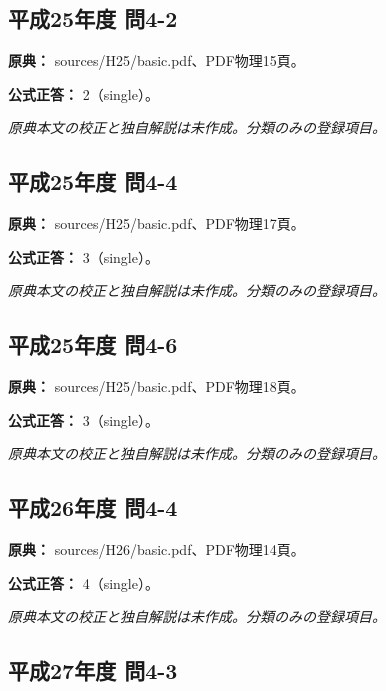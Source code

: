 \subsection{平成25年度 問4-2}
\label{q:h25-reg-basic-4-2}

\noindent\textbf{原典：} sources/H25/basic.pdf、PDF物理15頁。

\textbf{公式正答：} 2（single）。

\par\textit{原典本文の校正と独自解説は未作成。分類のみの登録項目。}

\subsection{平成25年度 問4-4}
\label{q:h25-reg-basic-4-4}

\noindent\textbf{原典：} sources/H25/basic.pdf、PDF物理17頁。

\textbf{公式正答：} 3（single）。

\par\textit{原典本文の校正と独自解説は未作成。分類のみの登録項目。}

\subsection{平成25年度 問4-6}
\label{q:h25-reg-basic-4-6}

\noindent\textbf{原典：} sources/H25/basic.pdf、PDF物理18頁。

\textbf{公式正答：} 3（single）。

\par\textit{原典本文の校正と独自解説は未作成。分類のみの登録項目。}

\subsection{平成26年度 問4-4}
\label{q:h26-reg-basic-4-4}

\noindent\textbf{原典：} sources/H26/basic.pdf、PDF物理14頁。

\textbf{公式正答：} 4（single）。

\par\textit{原典本文の校正と独自解説は未作成。分類のみの登録項目。}

\subsection{平成27年度 問4-3}
\label{q:h27-reg-basic-4-3}

